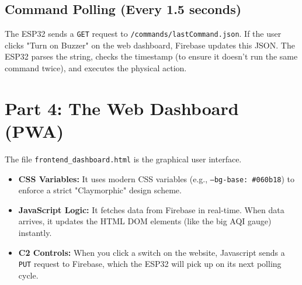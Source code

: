 \documentclass[11pt,a4paper]{article}
\begin{document}
\subsection{Command Polling (Every 1.5 seconds)}
The ESP32 sends a \texttt{GET} request to \texttt{/commands/lastCommand.json}.
If the user clicks "Turn on Buzzer" on the web dashboard, Firebase updates this JSON. The ESP32 parses the string, checks the timestamp (to ensure it doesn't run the same command twice), and executes the physical action.

\section{Part 4: The Web Dashboard (PWA)}
The file \texttt{frontend\_dashboard.html} is the graphical user interface.
\begin{itemize}
    \item \textbf{CSS Variables:} It uses modern CSS variables (e.g., \texttt{--bg-base: \#060b18}) to enforce a strict "Claymorphic" design scheme.
    \item \textbf{JavaScript Logic:} It fetches data from Firebase in real-time. When data arrives, it updates the HTML DOM elements (like the big AQI gauge) instantly.
    \item \textbf{C2 Controls:} When you click a switch on the website, Javascript sends a \texttt{PUT} request to Firebase, which the ESP32 will pick up on its next polling cycle.
\end{itemize}
\end{document}
